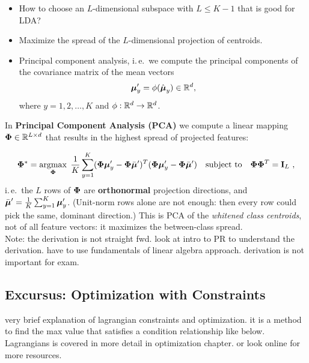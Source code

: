 \begin{center}
		\begin{minipage}{0.8\textwidth}
			\begin{itemize}
				\item[{\bf Problem}:] How to choose an $L$-dimensional subspace with $L\le K-1$ that is good for  LDA? 
				\item[{\bf Idea}:] Maximize the spread of the $L$-dimensional projection of centroids. 
				\item[{\bf Solution}:] Principal component analysis, i.\,e.\    we compute the principal components of the  covariance matrix of the mean vectors
				      $$\bm{\mathrm{\mu}}'_y = \phi(\hat{\bm{\mathrm{\mu}}}_y) \in \mathbb{R}^{d},$$
				      where $y=1,2,\dots, K$ and $\phi:\mathbb{R}^d\to\mathbb{R}^d$.
			\end{itemize}
		\end{minipage}
	\end{center}
		In \textbf{Principal Component Analysis (PCA)} we compute a linear mapping $\mathbf{\Phi} \in \mathbb{R}^{L \times d}$ that
	results in the highest spread of projected features:
	
	\begin{displaymath}
		\mathbf{\Phi}^* = \operatorname*{argmax}_{\mathbf{\Phi}} \;
		\frac{1}{K}
		\sum_{y=1}^K (\mathbf{\Phi}\bm{\mathrm{\mu}}'_y - \mathbf{\Phi}\bar{\bm{\mathrm{\mu}}}' )^T
		(\mathbf{\Phi}\bm{\mathrm{\mu}}'_y - \mathbf{\Phi}\bar{\bm{\mathrm{\mu}}}' )
		\quad\text{subject to}\quad \mathbf{\Phi}\mathbf{\Phi}^T=\mathbf{I}_L~,
	\end{displaymath}
	i.\,e.\ the $L$ rows of $\mathbf{\Phi}$ are \textbf{orthonormal} projection directions, and $\bar{\bm{\mathrm{\mu}}}' = \frac{1}{K}\sum_{y=1}^K\bm{\mathrm{\mu}}'_y$. (Unit-norm rows alone are not enough: then every row could pick the same, dominant direction.) This is PCA of the \emph{whitened class centroids}, not of all feature vectors: it maximizes the between-class spread.\\
	Note: the derivation is not straight fwd. look at intro to PR to understand the derivation. have to use fundamentals of linear algebra approach. derivation is not important for exam. 
	
	\subsection{Excursus: Optimization with Constraints}
	very brief explanation of lagrangian constraints and optimization. it is a method to find the max value that satisfies a condition relationship like below. Lagrangians is covered in more detail in optimization chapter. or look online for more resources. 
	
